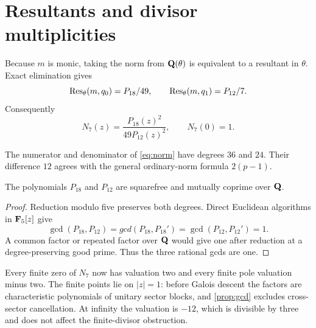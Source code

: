 \section{Resultants and divisor multiplicities}

Because $m$ is monic, taking the norm from $\mathbf Q(\theta)$ is equivalent to a
resultant in $\theta$.  Exact elimination gives
\[
 \operatorname{Res}_{\theta}(m,q_0)=P_{18}/49,
 \qquad
 \operatorname{Res}_{\theta}(m,q_1)=P_{12}/7.
\]
Consequently
\begin{equation}\label{eq:norm}
 N_7(z)=\frac{P_{18}(z)^2}{49P_{12}(z)^2},
 \qquad N_7(0)=1.
\end{equation}

The numerator and denominator of \eqref{eq:norm} have degrees $36$ and $24$.
Their difference $12$ agrees with the general ordinary-norm formula
$2(p-1)$.

\begin{proposition}\label{prop:gcd}
The polynomials $P_{18}$ and $P_{12}$ are squarefree and mutually coprime over
$\mathbf Q$.
\end{proposition}

\begin{proof}
Reduction modulo five preserves both degrees.  Direct Euclidean algorithms in
$\mathbf F_5[z]$ give
\[
 \gcd(P_{18},P_{12})=gcd(P_{18},P_{18}')
 =\gcd(P_{12},P_{12}')=1.
\]
A common factor or repeated factor over $\mathbf Q$ would give one after reduction
at a degree-preserving good prime.  Thus the three rational gcds are one.
\end{proof}

Every finite zero of $N_7$ now has valuation two and every finite pole
valuation minus two.  The finite points lie on $|z|=1$: before Galois descent
the factors are characteristic polynomials of unitary sector blocks, and
\cref{prop:gcd} excludes cross-sector cancellation.  At infinity the
valuation is $-12$, which is divisible by three and does not affect the
finite-divisor obstruction.
